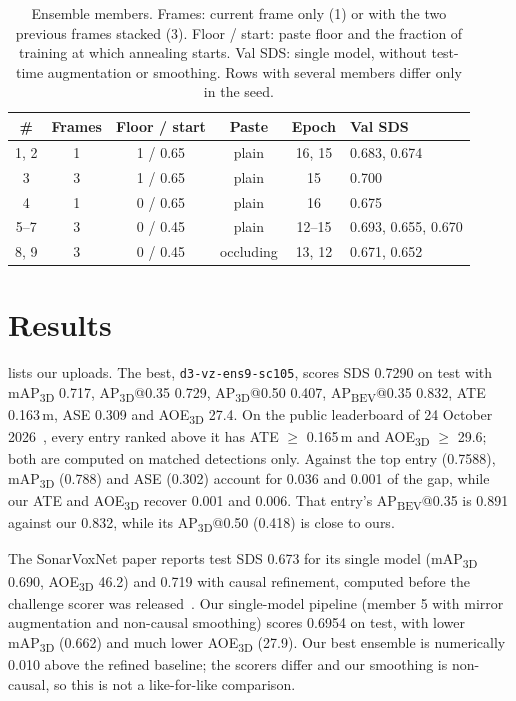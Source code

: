 \documentclass[10pt,twocolumn,letterpaper]{article}
\makeatletter
\newcommand{\sds}{\mbox{SDS}}
\newcommand{\aoe}{\mbox{AOE\textsubscript{3D}}}
\newcommand{\apt}[1]{\mbox{AP\textsubscript{3D}@#1}}
\newcommand{\apb}[1]{\mbox{AP\textsubscript{BEV}@#1}}
\makeatother
\begin{document}
\begin{table}[t]
\centering
\footnotesize
\setlength{\tabcolsep}{3pt}
\begin{tabular}{@{}cccccl@{}}
\toprule
\# & Frames & Floor / start & Paste & Epoch & Val \sds{} \\
\midrule
1, 2 & 1 & 1 / 0.65 & plain & 16, 15 & 0.683, 0.674 \\
3 & 3 & 1 / 0.65 & plain & 15 & 0.700 \\
4 & 1 & 0 / 0.65 & plain & 16 & 0.675 \\
5--7 & 3 & 0 / 0.45 & plain & 12--15 & 0.693, 0.655, 0.670 \\
8, 9 & 3 & 0 / 0.45 & occluding & 13, 12 & 0.671, 0.652 \\
\bottomrule
\end{tabular}
\caption{Ensemble members. Frames: current frame only (1) or with the two previous frames stacked (3). Floor / start: paste floor and the fraction of training at which annealing starts. Val \sds{}: single model, without test-time augmentation or smoothing. Rows with several members differ only in the seed.}
\label{tab:members}
\end{table}

\section{Results}
\label{sec:results}
 lists our uploads.
The best, \texttt{d3-vz-ens9-sc105}, scores \sds{} 0.7290 on test with mAP\textsubscript{3D} 0.717, \apt{0.35} 0.729, \apt{0.50} 0.407, \apb{0.35} 0.832, ATE 0.163\,m, ASE 0.309 and \aoe{} 27.4\textdegree.
On the public leaderboard of 24 October 2026~\cite{macvilb2026}, every entry ranked above it has ATE $\ge$ 0.165\,m and \aoe{} $\ge$ 29.6\textdegree; both are computed on matched detections only.
Against the top entry (0.7588), mAP\textsubscript{3D} (0.788) and ASE (0.302) account for 0.036 and 0.001 of the gap, while our ATE and \aoe{} recover 0.001 and 0.006.
That entry's \apb{0.35} is 0.891 against our 0.832, while its \apt{0.50} (0.418) is close to ours.

The SonarVoxNet paper reports test \sds{} 0.673 for its single model (mAP\textsubscript{3D} 0.690, \aoe{} 46.2\textdegree) and 0.719 with causal refinement, computed before the challenge scorer was released~\cite{sonarvoxnet2026}.
Our single-model pipeline (member 5 with mirror augmentation and non-causal smoothing) scores 0.6954 on test, with lower mAP\textsubscript{3D} (0.662) and much lower \aoe{} (27.9\textdegree).
Our best ensemble is numerically 0.010 above the refined baseline; the scorers differ and our smoothing is non-causal, so this is not a like-for-like comparison.
\end{document}
